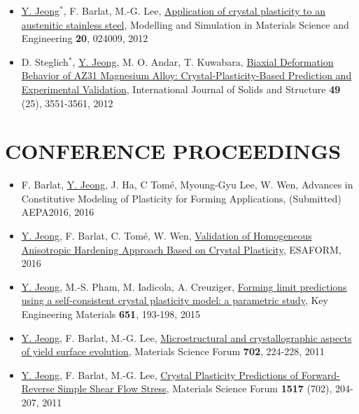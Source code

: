 \documentclass{res}
\begin{document}
\begin{resume}
\begin{itemize}
  \item \underline{Y. Jeong}$^*$, F. Barlat, M.-G. Lee,  \href{http://dx.doi.org/10.1088/0965-0393/20/2/024009}{Application of crystal plasticity to an austenitic stainless steel}, Modelling and Simulation in Materials Science and Engineering {\bf 20}, 024009, 2012
  \item D. Steglich$^*$, \underline{Y. Jeong}, M. O. Andar, T. Kuwabara, \href{http://dx.doi.org/10.1016/j.ijsolstr.2012.06.017}{Biaxial Deformation Behavior of AZ31 Magnesium Alloy: Crystal-Plasticity-Based Prediction and Experimental Validation}, International Journal of Solids and Structure {\bf 49} (25), 3551-3561, 2012
  \end{itemize}


  \section{CONFERENCE PROCEEDINGS}
  \begin{itemize}
  \item F. Barlat, \underline{Y. Jeong}, J. Ha, C Tom\'{e}, Myoung-Gyu Lee, W. Wen, Advances in Constitutive Modeling of Plasticity for Forming Applications, (Submitted) AEPA2016, 2016
  \item \underline{Y. Jeong}, F. Barlat, C. Tom\'{e}, W. Wen, \href{http://dx.doi.org/10.1063/1.4963544}{Validation of Homogeneous Anisotropic Hardening Approach Based on Crystal Plasticity}, ESAFORM, 2016
  \item \underline{Y. Jeong}, M.-S. Pham, M. Iadicola, A. Creuziger, \href{https://doi.org/10.4028/www.scientific.net/KEM.651-653.193}{Forming limit predictions using a self-consistent crystal plasticity model: a parametric study}, Key Engineering Materials {\bf 651}, 193-198, 2015
  \item \underline{Y. Jeong}, F. Barlat, M.-G. Lee, \href{https://doi.org/10.4028/www.scientific.net/MSF.702-703.224}{Microstructural and crystallographic aspects of yield surface evolution}, Materials Science Forum {\bf 702}, 224-228, 2011
  \item \underline{Y. Jeong}, F. Barlat, M.-G. Lee, \href{https://doi.org/10.4028/www.scientific.net/MSF.702-703.204}{Crystal Plasticity Predictions of Forward-Reverse Simple Shear Flow Stress}, Materials Science Forum {\bf 1517} (702), 204-207, 2011
  \end{itemize}


\end{resume}
\end{document}
